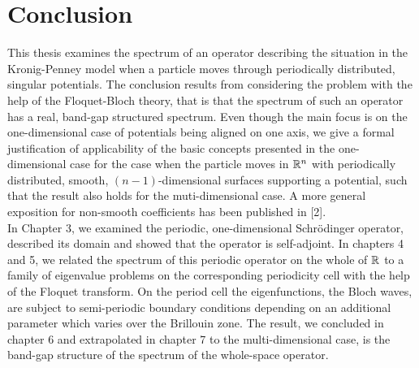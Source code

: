 \chapter{Conclusion} \label{chap:8}
	
This thesis examines the spectrum of an operator describing the situation in the Kronig-Penney model when a particle moves through periodically distributed, singular potentials. The conclusion results from considering the problem with the help of the Floquet-Bloch theory, that is that the spectrum of such an operator has a real, band-gap structured spectrum. Even though the main focus is on the one-dimensional case of potentials being aligned on one axis, we give a formal justification of applicability of the basic concepts presented in the one-dimensional case for the case when the particle moves in $\mathbb{R}^{n}$ with periodically distributed, smooth, $(n-1)$-dimensional surfaces supporting a potential, such that the result also holds for the muti-dimensional case. A more general exposition for non-smooth coefficients has been published in [2].
~\\

In Chapter 3, we examined the periodic, one-dimensional Schrödinger operator, described its domain and showed that the operator is self-adjoint. In chapters 4 and 5, we related the spectrum of this periodic operator on the whole of $\mathbb{R}$ to a family of eigenvalue problems on the corresponding periodicity cell with the help of the Floquet transform. On the period cell the eigenfunctions, the Bloch waves, are subject to semi-periodic boundary conditions depending on an additional parameter which varies over the Brillouin zone. The result, we concluded in chapter 6 and extrapolated in chapter 7 to the multi-dimensional case, is the band-gap structure of the spectrum of the whole-space operator.

~\\

